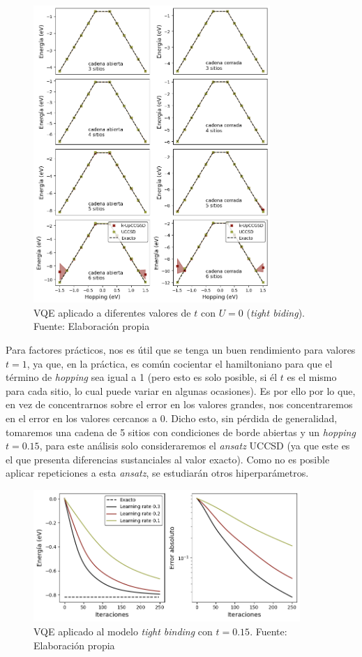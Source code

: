 \begin{figure}[H]
\centering
\includegraphics[width=0.8\textwidth]{figures/S4/tb/barridotb.png}
\caption{\label{fig:6} VQE aplicado a diferentes valores de $t$ con $U=0$ (\textit{tight biding}). Fuente: Elaboración propia}
\end{figure}

Para factores prácticos, nos es útil que se tenga un buen rendimiento para valores $t=1$, ya que, en la práctica, es común cocientar el hamiltoniano para que el término de \textit{hopping} sea igual a 1 (pero esto es solo posible, si él $t$ es el mismo para cada sitio, lo cual puede variar en algunas ocasiones). Es por ello por lo que, en vez de concentrarnos sobre el error en los valores grandes, nos concentraremos en el error en los valores cercanos a 0. Dicho esto, sin pérdida de generalidad, tomaremos una cadena de 5 sitios con condiciones de borde abiertas y un \textit{hopping} $t=0.15$, para este análisis solo consideraremos el \textit{ansatz} UCCSD (ya que este es el que presenta diferencias sustanciales al valor exacto). Como no es posible aplicar repeticiones a esta \textit{ansatz}, se estudiarán otros hiperparámetros.

\begin{figure}[H]
\centering
\includegraphics[width=0.9\textwidth]{figures/S4/tb/barridotb2.png}
\caption{\label{fig:11} VQE aplicado al modelo \textit{tight binding} con $t=0.15$. Fuente: Elaboración propia}
\end{figure}

